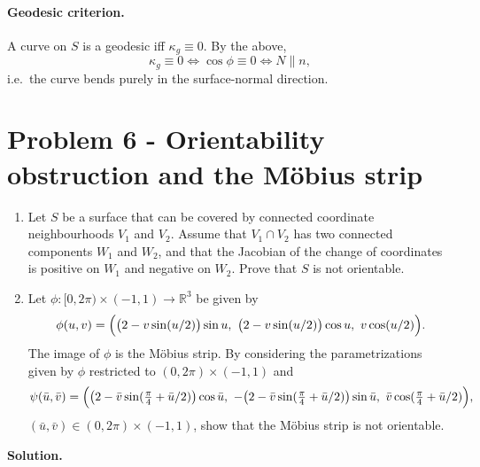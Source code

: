 \documentclass[12pt,a4paper]{article}
\theoremstyle{plain}
\theoremstyle{definition}      %
\begin{document}
	\paragraph{Geodesic criterion.}
	A curve on $S$ is a geodesic iff $\kappa_g\equiv 0$. By the above,
	\[
	\kappa_g\equiv 0
	\iff
	\cos\phi\equiv 0
	\iff
	N\parallel n,
	\]
	i.e.\ the curve bends purely in the surface-normal direction.
	

\section*{Problem 6 - Orientability obstruction and the M\"obius strip}


\begin{enumerate}
	\item
	Let $S$ be a surface that can be covered by connected coordinate neighbourhoods $V_1$ and $V_2$.
	Assume that $V_1\cap V_2$ has two connected components $W_1$ and $W_2$, and that the Jacobian of the change
	of coordinates is positive on $W_1$ and negative on $W_2$. Prove that $S$ is not orientable.
	
	\item
	Let $\phi\colon [0,2\pi)\times(-1,1)\to\mathbb{R}^3$ be given by
	\[
	\phi(u,v)=\Bigl(\bigl(2-v\sin(u/2)\bigr)\sin u,\ \bigl(2-v\sin(u/2)\bigr)\cos u,\ v\cos(u/2)\Bigr).
	\]
	The image of $\phi$ is the M\"obius strip. By considering the parametrizations given by $\phi$ restricted to
	$(0,2\pi)\times(-1,1)$ and
	\[
	\psi(\bar u,\bar v)=\Bigl(\bigl(2-\bar v\sin(\tfrac\pi4+\bar u/2)\bigr)\cos\bar u,\ 
	-\bigl(2-\bar v\sin(\tfrac\pi4+\bar u/2)\bigr)\sin\bar u,\ 
	\bar v\cos(\tfrac\pi4+\bar u/2)\Bigr),
	\]
	$(\bar u,\bar v)\in(0,2\pi)\times(-1,1)$, show that the M\"obius strip is not orientable.
\end{enumerate}

\bigskip

\noindent\textbf{Solution.}
\end{document}
